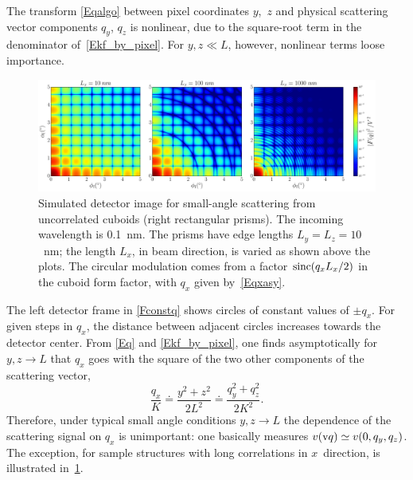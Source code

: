 The transform \cref{Eqalgo} between pixel coordinates $y$,~$z$
and physical scattering vector components $q_y$, $q_z$
is nonlinear, due to the square-root term in the denominator of~\cref{Ekf_by_pixel}.
For $y,z\ll L$, however, nonlinear terms loose importance.

\begin{figure}[t]
\begin{center}
\includegraphics[width=1\textwidth]{fig/ff2/ff_det_box.pdf}
\end{center}
\caption{Simulated detector image for small-angle scattering from
uncorrelated cuboids (right rectangular prisms).
The incoming wavelength is 0.1~nm.
The prisms have edge lengths $L_y=L_z=10$~nm;
the length $L_x$, in beam direction, is varied as shown above the plots.
%
The circular modulation comes from a factor $\operatorname{sinc}(q_x L_x/2)$
in the cuboid form factor, with $q_x$ given by~\cref{Eqxasy}.}
\label{Fdetbox}
\end{figure}

The left detector frame in \cref{Fconstq}
shows circles of constant values of $\pm q_x$.
For given steps in $q_x$, the distance between adjacent circles
increases towards the detector center.
From \cref{Eq} and \cref{Ekf_by_pixel},
one finds asymptotically for $y,z\to L$
that $q_x$ goes with the square of the two other components of the scattering vector,
\begin{equation}\label{Eqxasy}
  \frac{q_x}{K}
  \doteq \frac{y^2+z^2}{2 L^2}
  \doteq \frac{q_y^2 + q_z^2}{2K^2}.
\end{equation}
Therefore, under typical small angle conditions $y,z\to L$
the dependence of the scattering signal on $q_x$ is unimportant:
one basically measures $v(\text{v}{q})\simeq v(0,q_y,q_z)$.
The exception, for sample structures with long correlations in $x$~direction,
is illustrated in~\cref{Fdetbox}.

